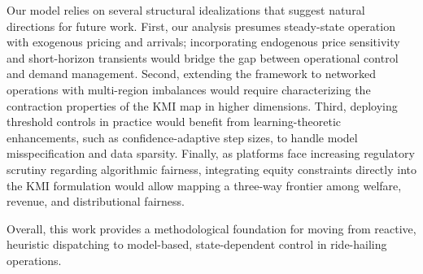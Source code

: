 Our model relies on several structural idealizations that suggest natural directions for future work.
First, our analysis presumes steady-state operation with exogenous pricing and arrivals; incorporating endogenous price sensitivity and short-horizon transients would bridge the gap between operational control and demand management.
Second, extending the framework to networked operations with multi-region imbalances would require characterizing the contraction properties of the KMI map in higher dimensions.
Third, deploying threshold controls in practice would benefit from learning-theoretic enhancements, such as confidence-adaptive step sizes, to handle model misspecification and data sparsity.
Finally, as platforms face increasing regulatory scrutiny regarding algorithmic fairness, integrating equity constraints directly into the KMI formulation would allow mapping a three-way frontier among welfare, revenue, and distributional fairness.

Overall, this work provides a methodological foundation for moving from reactive, heuristic dispatching to model-based, state-dependent control in ride-hailing operations.

